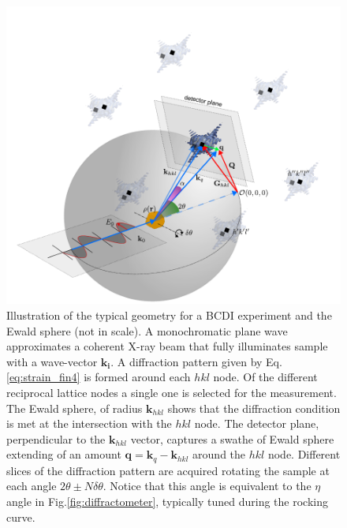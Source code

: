 \begin{figure}[H]
    \centering
    \includegraphics[width=\textwidth]{figures/Intro/ewald1.pdf}
    \caption{Illustration of the typical geometry for a BCDI experiment and the Ewald sphere (not in scale). A monochromatic plane wave approximates a 
    coherent X-ray beam that fully illuminates sample with a wave-vector $\mathbf{k_i}$. A diffraction pattern given by Eq. 
    \ref{eq:strain_fin4} is formed around each $hkl$ node. Of the different reciprocal lattice nodes a single one is 
    selected for the measurement. The Ewald sphere, of radius $\mathbf{k}_{hkl}$ shows that the diffraction condition is met
    at the intersection with the $hkl$ node. The detector plane, perpendicular to the $\mathbf{k}_{hkl}$ vector, captures 
    a swathe of Ewald sphere extending of an amount $\mathbf{q} = \mathbf{k}_{q} - \mathbf{k}_{hkl}$ around the $hkl$ node.
    Different slices of the diffraction pattern are acquired rotating the sample at each angle  $2\theta \pm N\delta \theta$. 
    Notice that this angle is equivalent to the $\eta$ angle in Fig.\ref{fig:diffractometer}, typically tuned during the 
    rocking curve.}
    \label{fig:ewald}
\end{figure}

